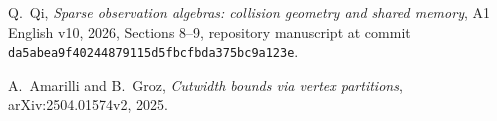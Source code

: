 Q.~Qi,
\emph{Sparse observation algebras: collision geometry and shared memory},
A1 English v10, 2026, Sections 8--9,
repository manuscript at commit
\texttt{da5abea9f40244879115d5fbcfbda375bc9a123e}.

A.~Amarilli and B.~Groz,
\emph{Cutwidth bounds via vertex partitions},
arXiv:2504.01574v2, 2025.
